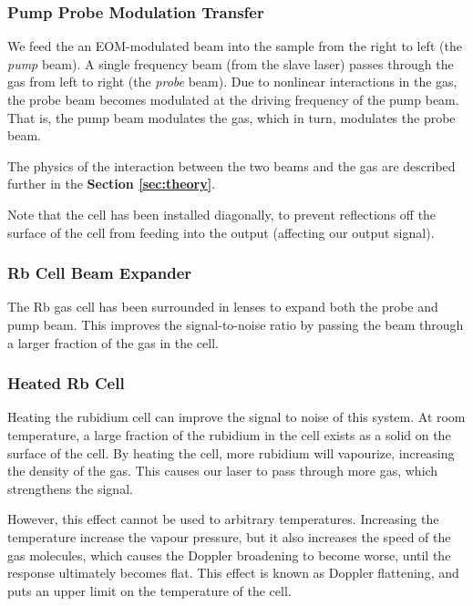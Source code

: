     \subsubsection{Pump Probe Modulation Transfer}

We feed the an EOM-modulated beam into the sample from the right to left (the \emph{pump} beam).  A single frequency beam (from the slave laser) passes through the gas from left to right (the \emph{probe} beam).  Due to nonlinear interactions in the gas, the probe beam becomes modulated at the driving frequency of the pump beam.  That is, the pump beam modulates the gas, which in turn, modulates the probe beam.

The physics of the interaction between the two beams and the gas are described further in the \textbf{Section \ref{sec:theory}}.

Note that the cell has been installed diagonally, to prevent reflections off the surface of the cell from feeding into the output (affecting our output signal).

    \subsubsection{Rb Cell Beam Expander}

The Rb gas cell has been surrounded in lenses to expand both the probe and pump beam.  This improves the signal-to-noise ratio by passing the beam through a larger fraction of the gas in the cell.

    \subsubsection{Heated Rb Cell}

Heating the rubidium cell can improve the signal to noise of this system.  At room temperature, a large fraction of the rubidium in the cell exists as a solid on the surface of the cell.  By heating the cell, more rubidium will vapourize, increasing the density of the gas.  This causes our laser to pass through more gas, which strengthens the signal.

However, this effect cannot be used to arbitrary temperatures.  Increasing the temperature increase the vapour pressure, but it also increases the speed of the gas molecules, which causes the Doppler broadening to become worse, until the response ultimately becomes flat.  This effect is known as Doppler flattening, and puts an upper limit on the temperature of the cell.

